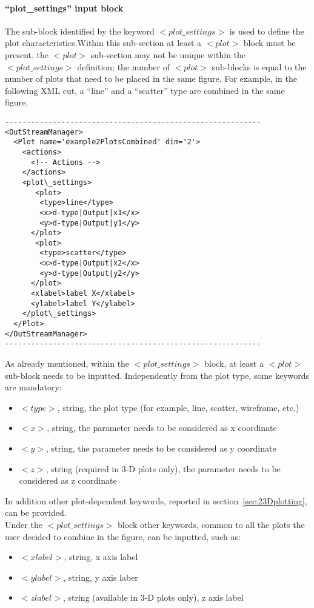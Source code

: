 \paragraph{``plot\_settings'' input block \label{sec:plotSettings}} 
The sub-block identified by the keyword $<plot\_settings>$ is used to define the plot characteristics.Within this sub-section at least a $<plot>$ block must be present. the $<plot>$ sub-section may not be unique within the $<plot\_settings>$  definition; the number of  $<plot>$ sub-blocks is equal to the number of plots that need to be placed in the same figure. For example, in the following XML cut, a ``line'' and a ``scatter'' type are combined in the same figure. 
\begin{lstlisting}[style=XML]
-----------------------------------------------------------
<OutStreamManager>
  <Plot name='example2PlotsCombined' dim='2'>
    <actions>
      <!-- Actions -->
    </actions>
    <plot\_settings>
       <plot>
        <type>line</type>
        <x>d-type|Output|x1</x>
        <y>d-type|Output|y1</y> 
      </plot>
       <plot>
        <type>scatter</type>
        <x>d-type|Output|x2</x>
        <y>d-type|Output|y2</y> 
      </plot>
      <xlabel>label X</xlabel>
      <ylabel>label Y</ylabel>
    </plot\_settings>
  </Plot>
</OutStreamManager>
-----------------------------------------------------------
\end{lstlisting}
As already mentioned, within the $<plot\_settings>$  block, at least a $<plot>$ sub-block needs to be inputted. Independently from the plot type, some keywords are mandatory:
\begin{itemize}
     \item \textit{$<type>$}, string, the plot type (for example, line, scatter, wireframe, etc.)
     \item \textit{$<x>$}, string, the parameter needs to be considered as x coordinate
     \item \textit{$<y>$}, string, the parameter needs to be considered as y coordinate
     \item \textit{$<z>$}, string (required in 3-D plots only), the parameter needs to be considered as z coordinate
\end{itemize}
In addition other plot-dependent keywords, reported in section~\ref{sec:23Dplotting}, can be provided. 
\\Under the  $<plot\_settings>$ block other keywords, common to all the plots the user decided to combine in the figure, can be inputted, such as:
\begin{itemize}
     \item \textit{$<xlabel>$}, string, x axis label
     \item \textit{$<ylabel>$}, string, y axis laber
     \item \textit{$<zlabel>$}, string (available in 3-D plots only), z axis label
\end{itemize}
